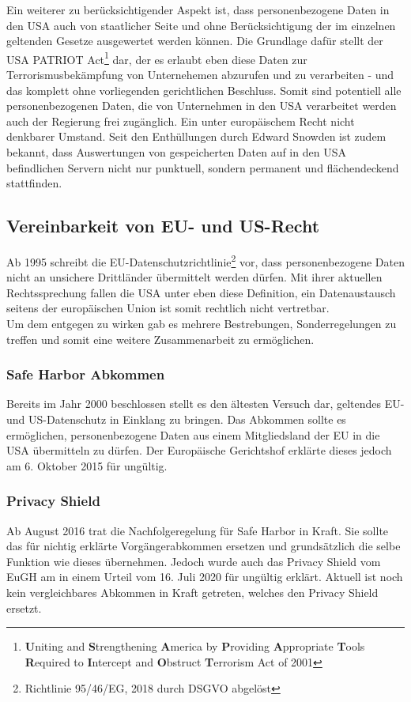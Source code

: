     Ein weiterer zu berücksichtigender Aspekt ist, dass personenbezogene Daten in den USA auch von staatlicher Seite und ohne Berücksichtigung der im einzelnen geltenden Gesetze ausgewertet werden können. Die Grundlage dafür stellt der \glqq USA PATRIOT Act\grqq{}\footnote{\textbf{U}niting and \textbf{S}trengthening \textbf{A}merica by \textbf{P}roviding \textbf{A}ppropriate \textbf{T}ools \textbf{R}equired to \textbf{I}ntercept and \textbf{O}bstruct \textbf{T}errorism Act of 2001} dar, der es erlaubt eben diese Daten zur Terrorismusbekämpfung von Unternehemen abzurufen und zu verarbeiten - und das komplett ohne vorliegenden gerichtlichen Beschluss. Somit sind potentiell alle personenbezogenen Daten, die von Unternehmen in den USA verarbeitet werden auch der Regierung frei zugänglich. Ein unter europäischem Recht nicht denkbarer Umstand. Seit den Enthüllungen durch Edward Snowden ist zudem bekannt, dass Auswertungen von gespeicherten Daten auf in den USA befindlichen Servern nicht nur punktuell, sondern permanent und flächendeckend stattfinden.\\
\subsection{Vereinbarkeit von EU- und US-Recht}
    Ab 1995 schreibt die EU-Datenschutzrichtlinie\footnote{Richtlinie 95/46/EG, 2018 durch DSGVO abgelöst} vor, dass personenbezogene Daten nicht an unsichere Drittländer übermittelt werden dürfen. Mit ihrer aktuellen Rechtssprechung fallen die USA unter eben diese Definition, ein Datenaustausch seitens der europäischen Union ist somit rechtlich nicht vertretbar.\\
    Um dem entgegen zu wirken gab es mehrere Bestrebungen, Sonderregelungen zu treffen und somit eine weitere Zusammenarbeit zu ermöglichen.

\subsubsection{Safe Harbor Abkommen}
    Bereits im Jahr 2000 beschlossen stellt es den ältesten Versuch dar, geltendes EU- und US-Datenschutz in Einklang zu bringen. Das Abkommen sollte es ermöglichen, personenbezogene Daten aus einem Mitgliedsland der EU in die USA übermitteln zu dürfen. Der Europäische Gerichtshof erklärte dieses jedoch am 6. Oktober 2015 für ungültig.

\subsubsection{Privacy Shield}
    Ab August 2016 trat die Nachfolgeregelung für Safe Harbor in Kraft. Sie sollte das für nichtig erklärte Vorgängerabkommen ersetzen und grundsätzlich die selbe Funktion wie dieses übernehmen. Jedoch wurde auch das Privacy Shield vom EuGH am in einem Urteil vom 16. Juli 2020 für ungültig erklärt. Aktuell ist noch kein vergleichbares Abkommen in Kraft getreten, welches den Privacy Shield ersetzt.
\vfill